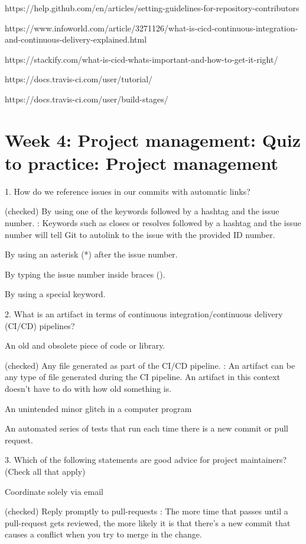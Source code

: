\documentclass[11pt, onecolumn]{article}
\begin{document}
    https://help.github.com/en/articles/setting-guidelines-for-repository-contributors 

    https://www.infoworld.com/article/3271126/what-is-cicd-continuous-integration-and-continuous-delivery-explained.html

    https://stackify.com/what-is-cicd-whats-important-and-how-to-get-it-right/

    https://docs.travis-ci.com/user/tutorial/

    https://docs.travis-ci.com/user/build-stages/
    

\section{Week 4: Project management: Quiz to practice: Project management}

1. How do we reference issues in our commits with automatic links?

(checked) By using one of the keywords followed by a hashtag and the issue number. : Keywords such as closes or resolves followed by a hashtag and the issue number will tell Git to autolink to the issue with the provided ID number.

By using an asterisk (*) after the issue number.

By typing the issue number inside braces ({}).

By using a special keyword.



2. What is an artifact in terms of continuous integration/continuous delivery (CI/CD) pipelines?

An old and obsolete piece of code or library.

(checked) Any file generated as part of the CI/CD pipeline.  : An artifact can be any type of file generated during the CI pipeline. An artifact in this context doesn’t have to do with how old something is.

An unintended minor glitch in a computer program

An automated series of tests that run each time there is a new commit or pull request.



3. Which of the following statements are good advice for project maintainers? (Check all that apply)

Coordinate solely via email

(checked) Reply promptly to pull-requests : The more time that passes until a pull-request gets reviewed, the more likely it is that there's a new commit that causes a conflict when you try to merge in the change.
\end{document}
